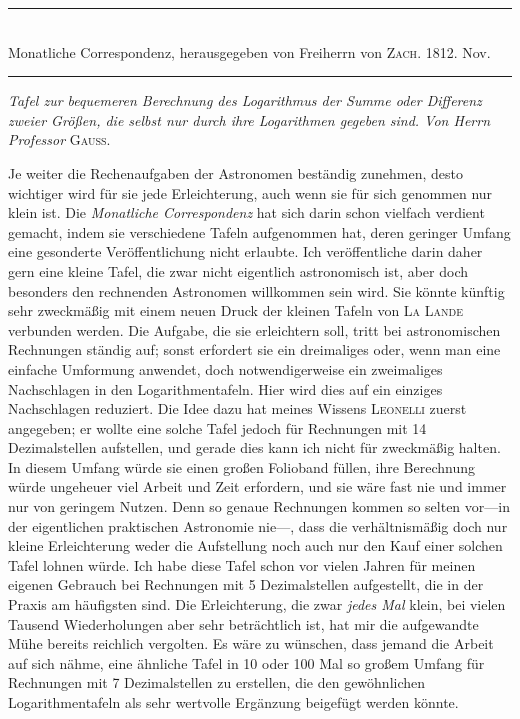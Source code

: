 \par{}
\begin{center}
\rule{0.66\linewidth}{0.3pt}\\
Monatliche Correspondenz, herausgegeben von Freiherrn von \textsc{Zach}. 1812. Nov.\\
\rule{0.66\linewidth}{0.3pt}
\end{center}

\emph{Tafel zur bequemeren Berechnung des Logarithmus der Summe oder Differenz zweier Größen, die selbst nur durch ihre Logarithmen gegeben sind. Von Herrn Professor} \textsc{Gauss}.

Je weiter die Rechenaufgaben der Astronomen beständig zunehmen, desto wichtiger wird für sie jede Erleichterung, auch wenn sie für sich genommen nur klein ist. Die \emph{Monatliche Correspondenz} hat sich darin schon vielfach verdient gemacht, indem sie verschiedene Tafeln aufgenommen hat, deren geringer Umfang eine gesonderte Veröffentlichung nicht erlaubte. Ich veröffentliche darin daher gern eine kleine Tafel, die zwar nicht eigentlich astronomisch ist, aber doch besonders den rechnenden Astronomen willkommen sein wird. Sie könnte künftig sehr zweckmäßig mit einem neuen Druck der kleinen Tafeln von \textsc{La
Lande} verbunden werden. Die Aufgabe, die sie erleichtern soll, tritt bei astronomischen Rechnungen ständig auf; sonst erfordert sie ein dreimaliges oder, wenn man eine einfache Umformung anwendet, doch notwendigerweise ein zweimaliges Nachschlagen in den Logarithmentafeln. Hier wird dies auf ein einziges Nachschlagen reduziert. Die Idee dazu hat meines Wissens \textsc{Leonelli} zuerst angegeben; er wollte eine solche Tafel jedoch für Rechnungen mit 14 Dezimalstellen aufstellen, und gerade dies kann ich nicht für zweckmäßig halten. In diesem Umfang würde sie einen großen Folioband füllen, ihre Berechnung würde ungeheuer viel Arbeit und Zeit erfordern, und sie wäre fast nie und immer nur von geringem Nutzen. Denn so genaue Rechnungen kommen so selten vor---in der eigentlichen praktischen Astronomie nie---, dass die verhältnismäßig doch nur kleine Erleichterung weder die Aufstellung noch auch nur den Kauf einer solchen Tafel lohnen würde. Ich habe diese Tafel schon vor vielen Jahren für meinen eigenen Gebrauch bei Rechnungen mit 5 Dezimalstellen aufgestellt, die in der Praxis am häufigsten sind. Die Erleichterung, die zwar \emph{jedes Mal} klein, bei vielen Tausend Wiederholungen aber sehr beträchtlich ist, hat mir die aufgewandte Mühe bereits reichlich vergolten. Es wäre zu wünschen, dass jemand die Arbeit auf sich nähme, eine ähnliche Tafel in 10 oder 100 Mal so großem Umfang für Rechnungen mit 7 Dezimalstellen zu 
erstellen, die den gewöhnlichen Logarithmentafeln als sehr wertvolle Ergänzung beigefügt werden könnte.

